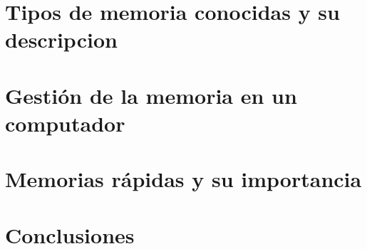 \documentclass{article}
\begin{document}
\section{Tipos de memoria conocidas y su descripcion} \label{types}


\section{Gestión de la memoria en un computador} \label{working}



\section{Memorias rápidas y su importancia}


\section{Conclusiones}




\end{document}
